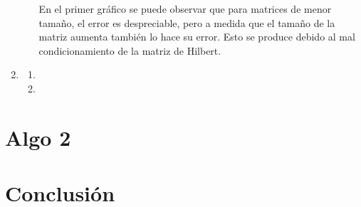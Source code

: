 \documentclass{udpreport}
\begin{document}
\begin{enumerate}
\begin{enumerate}
\begin{figure}[H]
 			\end{figure}
 		
 			En el primer gráfico se puede observar que para matrices de menor tamaño, el error es despreciable, pero a medida que el tamaño de la matriz aumenta también lo hace su error. Esto se produce debido al mal condicionamiento de la matriz de Hilbert.
 		\end{enumerate}
 		
	\item
 		\begin{enumerate}
			\item 
			\item 
		\end{enumerate}
 		
 \end{enumerate}
\newpage
\chapter{Algo 2}
    

     
 \newpage

    
    
\chapter{Conclusión}
      
\end{document}
